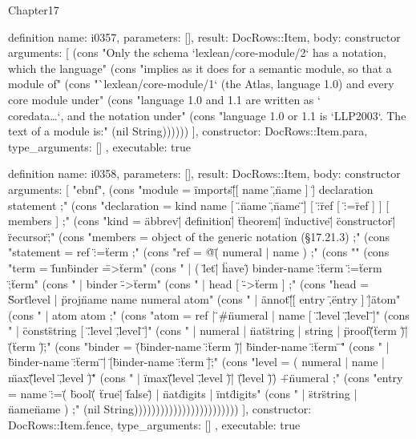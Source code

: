 \begin{lexlean}{Chapter17}
\begin{semanticmodule}
definition{
  name: i0357,
  parameters: [],
  result: DocRows::Item,
  body: constructor{
    arguments: [
      (cons "Only the schema `lexlean/core-module/2` has a notation, which the language" (cons "implies as it does for a semantic module, so that a module of" (cons "`lexlean/core-module/1` (the Atlas, language 1.0) and every core module under" (cons "language 1.0 and 1.1 are written as `\\coredata{…}`, and the notation under" (cons "language 1.0 or 1.1 is `LLP2003`. The text of a module is:" (nil String))))))
    ],
    constructor: DocRows::Item.para,
    type_arguments: []
  },
  executable: true
}

definition{
  name: i0358,
  parameters: [],
  result: DocRows::Item,
  body: constructor{
    arguments: [
      "ebnf",
      (cons "module      = \"imports\" \"[\" [ name { \",\" name } ] \"]\" { declaration } { statement } ;" (cons "declaration = kind name [ \".{\" name { \",\" name } \"}\" ] [ \":\" ref [ \":=\" ref ] ] [ members ] ;" (cons "kind        = \"abbrev\" | \"definition\" | \"theorem\" | \"inductive\" | \"constructor\" | \"recursor\" ;" (cons "members     = object of the generic notation (§17.21.3) ;" (cons "statement   = ref \":=\" term ;" (cons "ref         = \"@\" ( numeral | name ) ;" (cons "" (cons "term     = \"fun\" binder \"=>\" term" (cons "         | ( \"let\" | \"have\" ) binder-name \":\" term \":=\" term \";\" term" (cons "         | binder \"->\" term" (cons "         | head [ \"->\" term ] ;" (cons "head     = \"Sort\" level | \"proj\" name name numeral atom" (cons "         | \"annot\" \"[\" [ entry { \",\" entry } ] \"]\" atom" (cons "         | atom { atom } ;" (cons "atom     = ref | \"#\" numeral | name [ \".{\" level { \",\" level } \"}\" ]" (cons "         | \"const\" string [ \".{\" level { \",\" level } \"}\" ]" (cons "         | numeral | \"nat\" string | string | \"proof\" \"(\" term \")\" | \"(\" term \")\" ;" (cons "binder   = \"(\" binder-name \":\" term \")\" | \"{\" binder-name \":\" term \"}\"" (cons "         | \"{{\" binder-name \":\" term \"}}\" | \"[\" binder-name \":\" term \"]\" ;" (cons "level    = ( numeral | name | \"max\" \"(\" level \",\" level \")\"" (cons "           | \"imax\" \"(\" level \",\" level \")\" | \"(\" level \")\" ) { \"+\" numeral } ;" (cons "entry    = name \":=\" ( \"bool\" ( \"true\" | \"false\" ) | \"nat\" digits | \"int\" digits" (cons "                     | \"str\" string | \"name\" name ) ;" (nil String))))))))))))))))))))))))
    ],
    constructor: DocRows::Item.fence,
    type_arguments: []
  },
  executable: true
}


\end{semanticmodule}
\end{lexlean}
